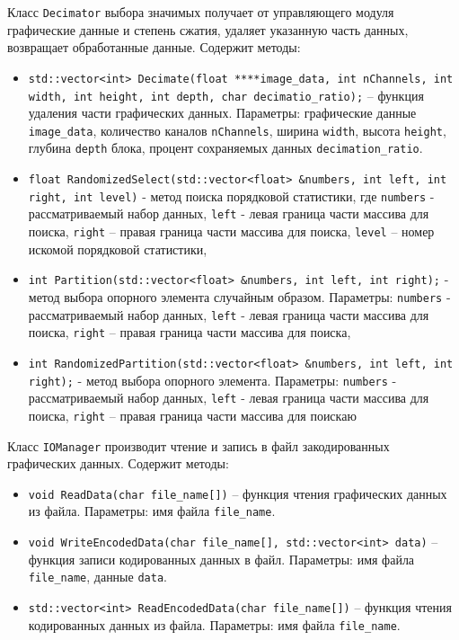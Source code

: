 Класс \texttt{Decimator} выбора значимых получает от управляющего модуля графические данные 
и степень сжатия, удаляет указанную часть данных, возвращает обработанные данные. Содержит методы:
\begin{itemize}
 \item \texttt{std::vector<int> Decimate(float ****image\_data, int nChannels, int width, 
 int height, int depth, char decimatio\_ratio);} – функция удаления части графических данных. 
Параметры: графические данные \texttt{image\_data}, количество каналов \texttt{nChannels}, 
ширина \texttt{width}, высота \texttt{height}, глубина \texttt{depth} блока, процент сохраняемых данных \texttt{decimation\_ratio}.
\item \texttt{float RandomizedSelect(std::vector<float> \&numbers, int left, int right, int level)} - метод поиска порядковой статистики, где 
\texttt{numbers} - рассматриваемый набор данных, \texttt{left} - левая граница части массива для поиска, \texttt{right} –
правая граница части массива для поиска, \texttt{level} – номер искомой порядковой
статистики,
\item \texttt{int Partition(std::vector<float> \&numbers, int left, int right);} - 
метод выбора опорного элемента случайным образом. Параметры:
\texttt{numbers} - рассматриваемый набор данных, \texttt{left} - левая граница части массива для поиска, \texttt{right} –
правая граница части массива для поиска,
\item \texttt{int RandomizedPartition(std::vector<float> \&numbers, int left, int right);} - метод выбора опорного элемента. Параметры:
\texttt{numbers} - рассматриваемый набор данных, \texttt{left} - левая граница части массива для поиска, \texttt{right} –
правая граница части массива для поискаю
\end{itemize}

Класс \texttt{IOManager} производит чтение и запись в файл закодированных графических данных. Содержит методы:

\begin{itemize}
 \item \texttt{void ReadData(char file\_name[])} – функция чтения графических данных из файла.
 Параметры: имя файла \texttt{file\_name}.
 \item \texttt{void WriteEncodedData(char file\_name[], std::vector<int> data)} – функция записи кодированных данных в файл. 
 Параметры: имя файла \texttt{file\_name}, данные \texttt{data}.
 \item \texttt{std::vector<int> ReadEncodedData(char file\_name[])} – функция чтения кодированных данных из файла. Параметры: имя файла \texttt{file\_name}.
\end{itemize}


